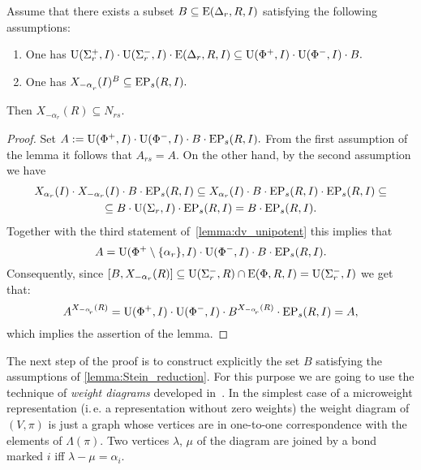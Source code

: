 
\begin{lemma}\label{lemma:Stein_reduction}
Assume that there exists a subset $B \subseteq \operatorname{E}(\Delta_r, R, I)$ satisfying the following assumptions:
\begin{enumerate}
 \item\label{stein_cond1} One has $\operatorname{U}(\Sigma^+_r, I)\cdot \operatorname{U}(\Sigma^-_r, I) \cdot \operatorname{E}(\Delta_r, R, I) \subseteq \operatorname{U}(\Phi^+, I)\cdot \operatorname{U}(\Phi^-, I) \cdot B.$
 \item\label{stein_cond2} One has $X_{-\alpha\ssub{r}}(I)^B \subseteq \EP_s(R, I).$
\end{enumerate}
Then $X_{-\alpha_r}(R) \subseteq N_{rs}.$
\end{lemma}
\begin{proof}
Set $A:=\operatorname{U}(\Phi^+, I)\cdot \operatorname{U}(\Phi^-, I) \cdot B \cdot \operatorname{EP}_s(R, I).$
From the first assumption of the lemma it follows that $A_{rs}=A$.
On the other hand, by the second assumption we have
\begin{multline*}
X_{\alpha_r}(I) \cdot X_{-\alpha_r}(I) \cdot B \cdot \operatorname{EP}_s(R, I) \subseteq 
X_{\alpha_r}(I) \cdot B \cdot \operatorname{EP}_s(R, I) \cdot \operatorname{EP}_s(R, I) \subseteq \\
\subseteq B \cdot \operatorname{U}(\Sigma_r, I) \cdot \operatorname{EP}_s(R, I) =
B \cdot \operatorname{EP}_s(R, I).
\end{multline*}
Together with the third statement of~\cref{lemma:dv_unipotent} this implies that
\begin{equation*} \label{rel:sred}
A = \operatorname{U}(\Phi^+\setminus\{\alpha_r\}, I) \cdot \operatorname{U}(\Phi^-, I) \cdot B \cdot \operatorname{EP}_s(R, I).
\end{equation*}
Consequently, since $[B, X_{-\alpha_r}(R)] \subseteq \operatorname{U}(\Sigma_r^-, R) \cap \operatorname{E}(\Phi, R, I) = \operatorname{U}(\Sigma_r^-, I)$ we get that:
\begin{equation*} \label{rel:ninv} A^{X_{-\alpha\ssub{r}}(R)} = \U(\Phi^+, I) \cdot \U(\Phi^-, I) \cdot B ^{X_{-\alpha\ssub{r}}(R)} \cdot \EP_s(R, I) = A, \end{equation*}
which implies the assertion of the lemma. \end{proof}

The next step of the proof is to construct explicitly the set $B$ satisfying the assumptions of \cref{lemma:Stein_reduction}.
For this purpose we are going to use the technique of {\it weight diagrams} developed in~\cite{PSV98}.
In the simplest case of a microweight representation (i.\,e. a representation without zero weights)
the weight diagram of $(V, \pi)$ is just a graph whose vertices are in one-to-one correspondence with the elements of $\Lambda(\pi)$.
Two vertices $\lambda$, $\mu$ of the diagram are joined by a bond marked $i$ iff $\lambda-\mu = \alpha_i$.

